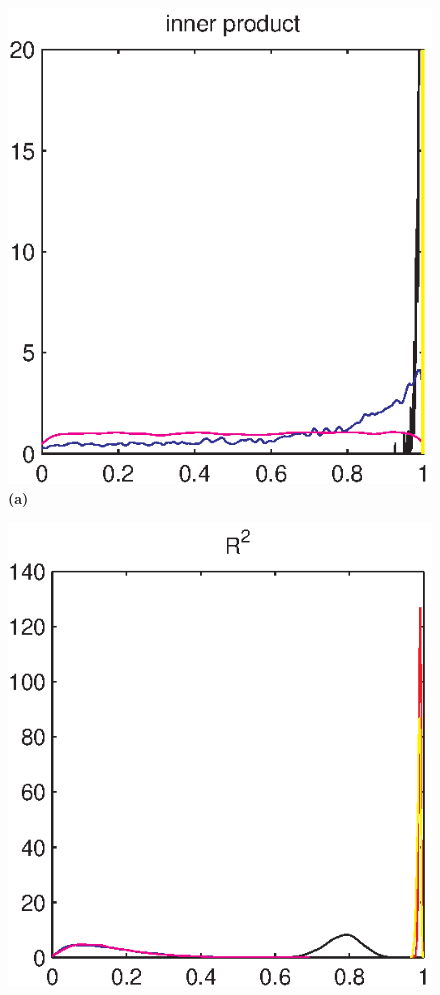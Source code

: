 \documentclass[authoryear,preprint,12pt]{elsarticle}
\begin{document}
\begin{figure}[tbp]
  \begin{center}
    \begin{minipage}[]{0.45\textwidth}
      \centering
      \includegraphics[width=\textwidth]{inner_product.eps}
      \textbf{(a)}
    \end{minipage}
    \begin{minipage}[]{0.45\textwidth}
      \centering
      \includegraphics[width=\textwidth]{R2.eps}

\end{minipage}
\end{center}
\end{figure}
\end{document}
